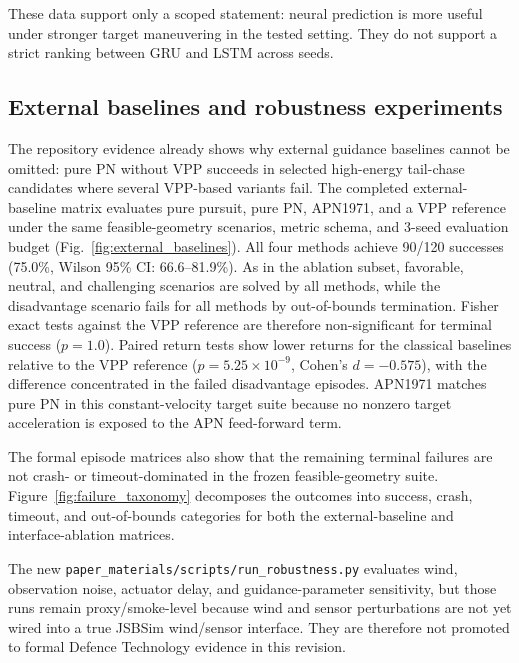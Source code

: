These data support only a scoped statement: neural prediction is more useful under stronger target maneuvering in the tested setting. They do not support a strict ranking between GRU and LSTM across seeds.

\subsection{External baselines and robustness experiments}\label{sec:external_and_robustness}

The repository evidence already shows why external guidance baselines cannot be omitted: pure PN without VPP succeeds in selected high-energy tail-chase candidates where several VPP-based variants fail. The completed external-baseline matrix evaluates pure pursuit, pure PN, APN1971, and a VPP reference under the same feasible-geometry scenarios, metric schema, and 3-seed evaluation budget (Fig.~\ref{fig:external_baselines}). All four methods achieve 90/120 successes (75.0\%, Wilson 95\% CI: 66.6--81.9\%). As in the ablation subset, favorable, neutral, and challenging scenarios are solved by all methods, while the disadvantage scenario fails for all methods by out-of-bounds termination. Fisher exact tests against the VPP reference are therefore non-significant for terminal success ($p=1.0$). Paired return tests show lower returns for the classical baselines relative to the VPP reference ($p=5.25\times10^{-9}$, Cohen's $d=-0.575$), with the difference concentrated in the failed disadvantage episodes. APN1971 matches pure PN in this constant-velocity target suite because no nonzero target acceleration is exposed to the APN feed-forward term.



The formal episode matrices also show that the remaining terminal failures are not crash- or timeout-dominated in the frozen feasible-geometry suite. Figure~\ref{fig:failure_taxonomy} decomposes the outcomes into success, crash, timeout, and out-of-bounds categories for both the external-baseline and interface-ablation matrices.



The new \texttt{paper\_materials/scripts/run\_robustness.py} evaluates wind, observation noise, actuator delay, and guidance-parameter sensitivity, but those runs remain proxy/smoke-level because wind and sensor perturbations are not yet wired into a true JSBSim wind/sensor interface. They are therefore not promoted to formal Defence Technology evidence in this revision.

